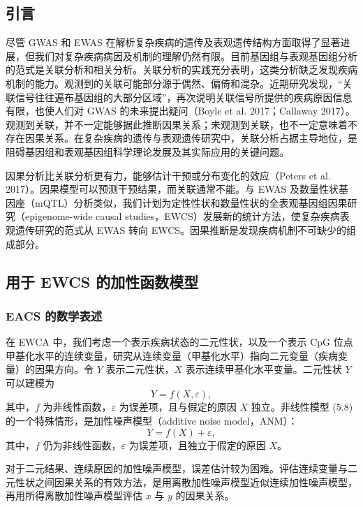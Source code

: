 \subsection{引言}

尽管 GWAS 和 EWAS 在解析复杂疾病的遗传及表观遗传结构方面取得了显著进展，但我们对复杂疾病病因及机制的理解仍然有限。目前基因组与表观基因组分析的范式是关联分析和相关分析。关联分析的实践充分表明，这类分析缺乏发现疾病机制的能力。观测到的关联可能部分源于偶然、偏倚和混杂。近期研究发现，“关联信号往往遍布基因组的大部分区域”，再次说明关联信号所提供的疾病原因信息有限，也使人们对 GWAS 的未来提出疑问（Boyle et al. 2017；Callaway 2017）。观测到关联，并不一定能够据此推断因果关系；未观测到关联，也不一定意味着不存在因果关系。在复杂疾病的遗传与表观遗传研究中，关联分析占据主导地位，是阻碍基因组和表观基因组科学理论发展及其实际应用的关键问题。

因果分析比关联分析更有力，能够估计干预或分布变化的效应（Peters et al. 2017）。因果模型可以预测干预结果，而关联通常不能。与 EWAS 及数量性状基因座（mQTL）分析类似，我们计划为定性性状和数量性状的全表观基因组因果研究（epigenome-wide causal studies，EWCS）发展新的统计方法，使复杂疾病表观遗传研究的范式从 EWAS 转向 EWCS。因果推断是发现疾病机制不可缺少的组成部分。

\subsection{用于 EWCS 的加性函数模型}
\subsubsection{EACS 的数学表述}

在 EWCA 中，我们考虑一个表示疾病状态的二元性状，以及一个表示 CpG 位点甲基化水平的连续变量，研究从连续变量（甲基化水平）指向二元变量（疾病变量）的因果方向。令 $Y$ 表示二元性状，$X$ 表示连续甲基化水平变量。二元性状 $Y$ 可以建模为
\begin{equation}
Y=f(X,\varepsilon),
\tag{5.8}
\end{equation}
其中，$f$ 为非线性函数，$\varepsilon$ 为误差项，且与假定的原因 $X$ 独立。非线性模型 (5.8) 的一个特殊情形，是加性噪声模型（additive noise model，ANM）：
\begin{equation}
Y=f(X)+\varepsilon,
\tag{5.9}
\end{equation}
其中，$f$ 仍为非线性函数，$\varepsilon$ 为误差项，且独立于假定的原因 $X$。

对于二元结果、连续原因的加性噪声模型，误差估计较为困难。评估连续变量与二元性状之间因果关系的有效方法，是用离散加性噪声模型近似连续加性噪声模型，再用所得离散加性噪声模型评估 $x$ 与 $y$ 的因果关系。

